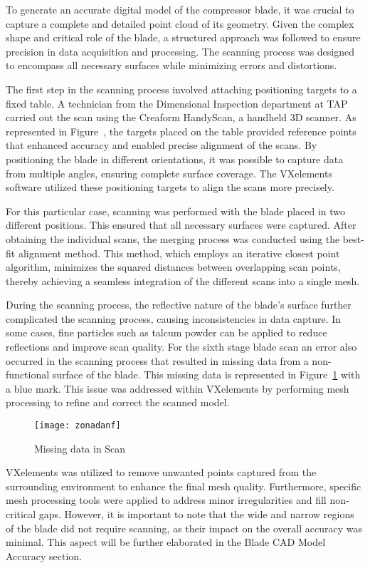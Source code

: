 To generate an accurate digital model of the compressor blade, it was crucial to capture a complete and detailed point cloud of its geometry. Given the complex shape and critical role of the blade, a structured approach was followed to ensure precision in data acquisition and processing. The scanning process was designed to encompass all necessary surfaces while minimizing errors and distortions.

The first step in the scanning process involved attaching positioning targets to a fixed table. A technician from the Dimensional Inspection department at \gls{TAP} carried out the scan using the Creaform HandyScan, a handheld 3D scanner. As represented in Figure~, the targets placed on the table provided reference points that enhanced accuracy and enabled precise alignment of the scans. By positioning the blade in different orientations, it was possible to capture data from multiple angles, ensuring complete surface coverage. The VXelements software utilized these positioning targets to align the scans more precisely.

For this particular case, scanning was performed with the blade placed in two different positions. This ensured that all necessary surfaces were captured. After obtaining the individual scans, the merging process was conducted using the best-fit alignment method. This method, which employs an iterative closest point algorithm, minimizes the squared distances between overlapping scan points, thereby achieving a seamless integration of the different scans into a single mesh.

During the scanning process, the reflective nature of the blade’s surface further complicated the scanning process, causing inconsistencies in data capture. In some cases, fine particles such as talcum powder can be applied to reduce reflections and improve scan quality. For the sixth stage blade scan an error also occurred in the scanning process that resulted in missing data from a non-functional surface of the blade. This missing data is represented in Figure~\ref{fig:zonadanf} with a blue mark. This issue was addressed within VXelements by performing mesh processing to refine and correct the scanned model.

\begin{figure}[H]
    \centering
    \texttt{[image: zonadanf]}
    \caption{Missing data in Scan}
    \label{fig:zonadanf}
\end{figure}

VXelements was utilized to remove unwanted points captured from the surrounding environment to enhance the final mesh quality. Furthermore, specific mesh processing tools were applied to address minor irregularities and fill non-critical gaps. However, it is important to note that the wide and narrow regions of the blade did not require scanning, as their impact on the overall accuracy was minimal. This aspect will be further elaborated in the Blade CAD Model Accuracy section.

